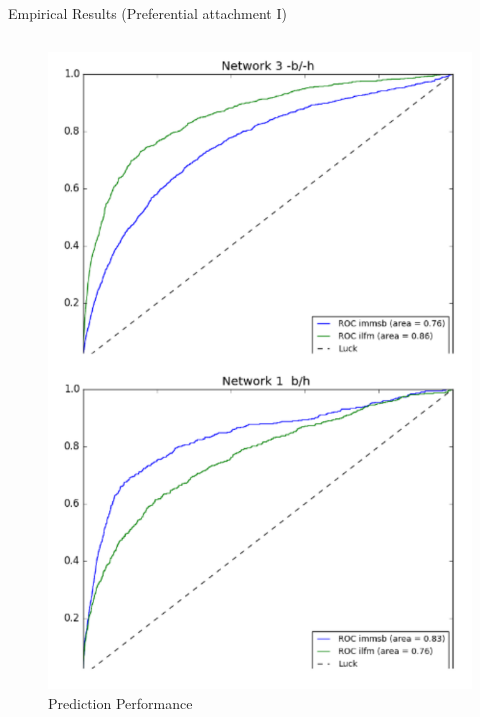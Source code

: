 \begin{frame}[c]{Empirical Results (Preferential attachment I)}
\begin{columns}[t]
        \begin{column}{0.5\textwidth}
        \begin{figure}[h]
            \caption{Prediction Performance}
        \includegraphics[scale=0.27]{img/auc.pdf}
        \end{figure}
        \end{column}
    \end{columns}

\end{frame}

